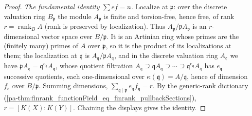 \begin{proof}
  \emph{The fundamental identity \(\sum e f = n\).} Localize at \(\mathfrak p\): over
  the discrete valuation ring \(B_{\mathfrak p}\) the module \(A_{\mathfrak p}\) is
  finite and torsion-free, hence free, of rank
  \(r = \operatorname{rank}_B A\) (rank is preserved by localization). Thus
  \(A_{\mathfrak p}/\mathfrak p A_{\mathfrak p}\) is an \(r\)-dimensional vector space
  over \(B/\mathfrak p\). It is an Artinian ring whose primes are the (finitely many)
  primes of \(A\) over \(\mathfrak p\), so it is the product of its localizations at
  them; the localization at \(\mathfrak q\) is
  \(A_{\mathfrak q}/\mathfrak p A_{\mathfrak q}\), and in the discrete valuation ring
  \(A_{\mathfrak q}\) we have \(\mathfrak p A_{\mathfrak q} =
  \mathfrak q^{e_{\mathfrak q}} A_{\mathfrak q}\), whose quotient filtration
  \(A_{\mathfrak q} \supseteq \mathfrak q A_{\mathfrak q} \supseteq \cdots \supseteq
  \mathfrak q^{e_{\mathfrak q}} A_{\mathfrak q}\) has \(e_{\mathfrak q}\) successive
  quotients, each one-dimensional over \(\kappa(\mathfrak q) = A/\mathfrak q\), hence
  of dimension \(f_{\mathfrak q}\) over \(B/\mathfrak p\). Summing dimensions,
  \(\sum_{\mathfrak q \mid \mathfrak p} e_{\mathfrak q} f_{\mathfrak q} = r\). By the
  generic-rank dictionary
  (\ref{pa-thm:finrank_functionField_eq_finrank_pullbackSections}),
  \(r = [K(X) : K(Y)]\). Chaining the displays gives the identity.
\end{proof}

